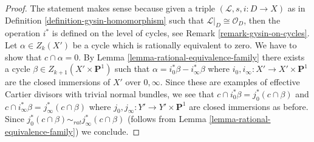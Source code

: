 \documentclass[10pt,a4paper]{amsart}
\theoremstyle{plain}
\theoremstyle{definition}
\theoremstyle{remark}
\numberwithin{equation}{subsection}
\begin{document}
\begin{proof}
The statement makes sense because given a triple
$(\mathcal{L}, s, i : D \to X)$ as in
Definition \ref{definition-gysin-homomorphism}
such that $\mathcal{L}|_D \cong \mathcal{O}_D$, then
the operation $i^*$ is defined on the level of cycles, see
Remark \ref{remark-gysin-on-cycles}.
Let $\alpha \in Z_k(X')$ be a cycle which is rationally equivalent to zero.
We have to show that $c \cap \alpha = 0$. By
Lemma \ref{lemma-rational-equivalence-family}
there exists a cycle $\beta \in Z_{k + 1}(X' \times \mathbf{P}^1)$
such that $\alpha = i_0^*\beta - i_\infty^*\beta$
where $i_0, i_\infty : X' \to X' \times \mathbf{P}^1$ are the
closed immersions of $X'$ over $0, \infty$. Since these are
examples of effective Cartier divisors with trivial normal
bundles, we see that $c \cap i_0^*\beta = j_0^*(c \cap \beta)$
and $c \cap i_\infty^*\beta = j_\infty^*(c \cap \beta)$
where $j_0, j_\infty : Y' \to Y' \times \mathbf{P}^1$ are
closed immersions as before. Since
$j_0^*(c \cap \beta) \sim_{rat} j_\infty^*(c \cap \beta)$
(follows from Lemma \ref{lemma-rational-equivalence-family}) we conclude.
\end{proof}
\end{document}
